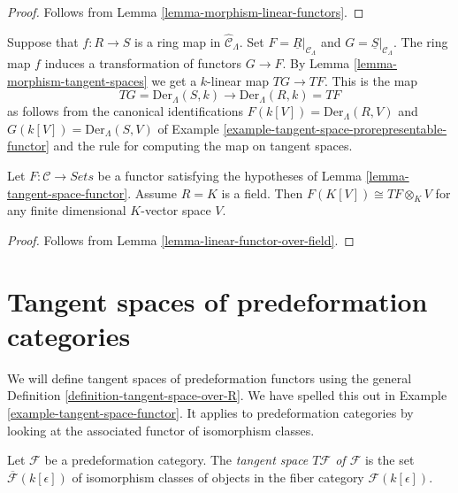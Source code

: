 \begin{proof}
Follows from
Lemma \ref{lemma-morphism-linear-functors}.
\end{proof}

\begin{example}
\label{example-tangent-space-map-prorepresentable-functor}
Suppose that $f : R \to S$ is a ring map in $\widehat{\mathcal{C}}_\Lambda$.
Set $F = \underline{R}|_{\mathcal{C}_\Lambda}$ and
$G = \underline{S}|_{\mathcal{C}_\Lambda}$. The ring map
$f$ induces a transformation of functors $G \to F$. By
Lemma \ref{lemma-morphism-tangent-spaces}
we get a $k$-linear map $TG \to TF$. This is the map
$$
TG = \text{Der}_\Lambda(S, k) \longrightarrow \text{Der}_\Lambda(R, k) = TF
$$
as follows from the canonical identifications
$F(k[V]) = \text{Der}_\Lambda(R, V)$ and
$G(k[V]) = \text{Der}_\Lambda(S, V)$ of
Example \ref{example-tangent-space-prorepresentable-functor}
and the rule for computing the map on tangent spaces.
\end{example}

\begin{lemma}
\label{lemma-tangent-space-tensor}
Let $F: \mathcal{C} \to \textit{Sets}$ be a functor satisfying the
hypotheses of
Lemma \ref{lemma-tangent-space-functor}.
Assume $R = K$ is a field. Then $F(K[V]) \cong TF \otimes_K V$
for any finite dimensional $K$-vector space $V$.
\end{lemma}

\begin{proof}
Follows from
Lemma \ref{lemma-linear-functor-over-field}.
\end{proof}






\section{Tangent spaces of predeformation categories}
\label{section-tangent-spaces}

\noindent
We will define tangent spaces of predeformation functors using the general
Definition \ref{definition-tangent-space-over-R}.
We have spelled this out in
Example \ref{example-tangent-space-functor}.
It applies to predeformation categories by looking at the associated
functor of isomorphism classes.

\begin{definition}
\label{definition-tangent-space}
Let $\mathcal{F}$ be a predeformation category.
The {\it tangent space $T \mathcal{F}$ of $\mathcal{F}$}
is the set $\overline{\mathcal{F}}(k[\epsilon])$
of isomorphism classes of objects in the fiber category $\mathcal
F(k[\epsilon])$.
\end{definition}

